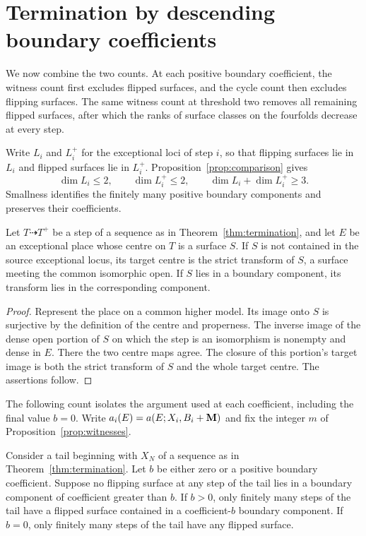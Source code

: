 \section{Termination by descending boundary coefficients}
\label{sec:termination}

We now combine the two counts.  At each positive boundary coefficient,
the witness count first excludes flipped surfaces, and the cycle count
then excludes flipping surfaces.  The same witness count at threshold
two removes all remaining flipped surfaces, after which the ranks of
surface classes on the fourfolds decrease at every step.

Write $L_i$ and $L_i^+$ for the exceptional loci of step $i$, so that
flipping surfaces lie in $L_i$ and flipped surfaces lie in $L_i^+$.
Proposition~\ref{prop:comparison} gives
\begin{equation}\label{eq:final-dimension}
 \dim L_i\leq2,\qquad \dim L_i^+\leq2,\qquad
 \dim L_i+\dim L_i^+\geq3.
\end{equation}
Smallness identifies the finitely many positive boundary
components and preserves their coefficients.

\begin{lemma}\label{lem:persistence}
Let $T\dashrightarrow T^+$ be a step of a sequence as in
Theorem~\ref{thm:termination}, and let $E$ be an exceptional place
whose centre on $T$ is a surface $S$.  If $S$ is not contained in the
source exceptional locus, its target centre is the strict transform
of $S$, a surface meeting the common isomorphic open. If $S$
lies in a boundary component, its transform lies in the
corresponding component.
\end{lemma}

\begin{proof}
Represent the place on a common higher model.  Its image onto $S$ is
surjective by the definition of the centre and properness.  The inverse
image of the dense open portion of $S$ on which the step is an
isomorphism is nonempty and dense in $E$.  There the two centre maps agree.
The closure of this portion's target image is both the strict
transform of $S$ and the whole target centre. The assertions
follow.
\end{proof}

The following count isolates the argument used at each coefficient,
including the final value $b=0$.  Write
$a_i(E)=a(E;X_i,B_i+\mathbf M)$ and fix the integer $m$ of
Proposition~\ref{prop:witnesses}.

\begin{lemma}
\label{lem:coefficient-witness-count}
Consider a tail beginning with $X_N$ of a sequence as in
Theorem~\ref{thm:termination}.  Let $b$ be either zero or a positive
boundary coefficient.  Suppose no flipping surface at any step of the
tail lies in a boundary component of coefficient greater than $b$.
If $b>0$, only finitely many steps of the tail have a flipped surface
contained in a coefficient-$b$ boundary component.  If $b=0$, only
finitely many steps of the tail have any flipped surface.
\end{lemma}

